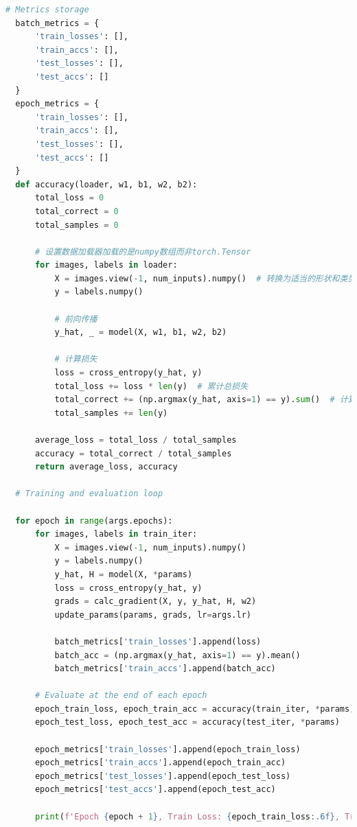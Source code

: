 \documentclass[12pt]{article}
\begin{document}
\begin{lstlisting}[language=Python]
  # Metrics storage
  batch_metrics = {
      'train_losses': [], 
      'train_accs': [], 
      'test_losses': [], 
      'test_accs': []
  }
  epoch_metrics = {
      'train_losses': [], 
      'train_accs': [], 
      'test_losses': [], 
      'test_accs': []
  }
  def accuracy(loader, w1, b1, w2, b2):
      total_loss = 0
      total_correct = 0
      total_samples = 0
      
      # 设置数据加载器加载的是numpy数组而非torch.Tensor
      for images, labels in loader:
          X = images.view(-1, num_inputs).numpy()  # 转换为适当的形状和类型
          y = labels.numpy()
          
          # 前向传播
          y_hat, _ = model(X, w1, b1, w2, b2)
          
          # 计算损失
          loss = cross_entropy(y_hat, y)
          total_loss += loss * len(y)  # 累计总损失
          total_correct += (np.argmax(y_hat, axis=1) == y).sum()  # 计算正确预测的数量
          total_samples += len(y)
      
      average_loss = total_loss / total_samples
      accuracy = total_correct / total_samples
      return average_loss, accuracy
  
  # Training and evaluation loop
  
  for epoch in range(args.epochs):
      for images, labels in train_iter:
          X = images.view(-1, num_inputs).numpy()
          y = labels.numpy()
          y_hat, H = model(X, *params)
          loss = cross_entropy(y_hat, y)
          grads = calc_gradient(X, y, y_hat, H, w2)
          update_params(params, grads, lr=args.lr)
  
          batch_metrics['train_losses'].append(loss)
          batch_acc = (np.argmax(y_hat, axis=1) == y).mean()
          batch_metrics['train_accs'].append(batch_acc)
  
      # Evaluate at the end of each epoch
      epoch_train_loss, epoch_train_acc = accuracy(train_iter, *params)
      epoch_test_loss, epoch_test_acc = accuracy(test_iter, *params)
  
      epoch_metrics['train_losses'].append(epoch_train_loss)
      epoch_metrics['train_accs'].append(epoch_train_acc)
      epoch_metrics['test_losses'].append(epoch_test_loss)
      epoch_metrics['test_accs'].append(epoch_test_acc)
  
      print(f'Epoch {epoch + 1}, Train Loss: {epoch_train_loss:.6f}, Train Acc: {epoch_train_acc:.6f}, Test Loss: {epoch_test_loss:.6f}, Test Acc: {epoch_test_acc:.6f}')
  

\end{lstlisting}
\end{document}
